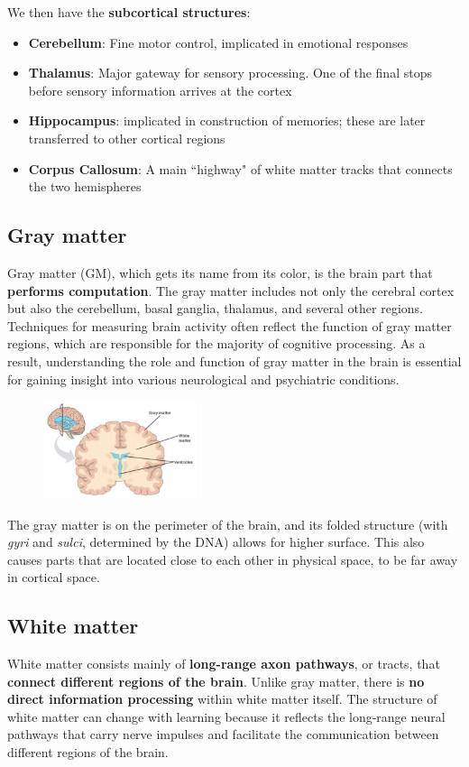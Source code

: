 We then have the \textbf{subcortical structures}:
\begin{itemize}
    \item \textbf{Cerebellum}: Fine motor control, implicated in emotional responses
    \item \textbf{Thalamus}: Major gateway for sensory processing. One of the final stops before sensory information arrives at the cortex
    \item \textbf{Hippocampus}: implicated in construction of memories; these are later transferred to other cortical regions
    \item \textbf{Corpus Callosum}: A main ``highway" of white matter tracks that connects the two hemispheres
\end{itemize}

\subsection{Gray matter}
Gray matter (GM), which gets its name from its color, is the brain part that \textbf{performs computation}. The gray matter includes not only the cerebral cortex but also the cerebellum, basal ganglia, thalamus, and several other regions. Techniques for measuring brain activity often reflect the function of gray matter regions, which are responsible for the majority of cognitive processing. As a result, understanding the role and function of gray matter in the brain is essential for gaining insight into various neurological and psychiatric conditions.

\begin{figure}
  \centering
  \includegraphics[width=0.4\textwidth]{images/brain_2.png}
\end{figure}

The gray matter is on the perimeter of the brain, and its folded structure (with \textit{gyri} and \textit{sulci}, determined by the DNA) allows for higher surface. This also causes parts that are located close to each other in physical space, to be far away in cortical space.

\subsection{White matter}
White matter consists mainly of \textbf{long-range axon pathways}, or tracts, that \textbf{connect different regions of the brain}. Unlike gray matter, there is \textbf{no direct information processing} within white matter itself. The structure of white matter can change with learning because it reflects the long-range neural pathways that carry nerve impulses and facilitate the communication between different regions of the brain. 

